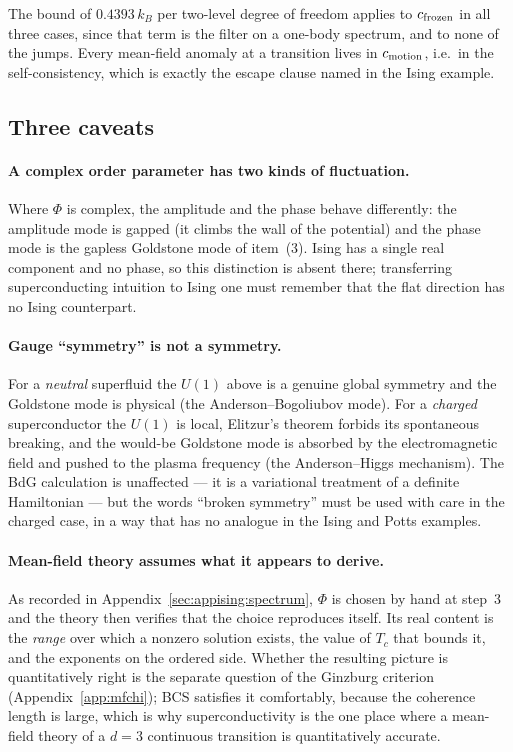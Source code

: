 \documentclass[10pt,a4paper]{article}
\theoremstyle{remark}
\begin{document}
The bound of $0.4393\,k_B$ per two-level degree of freedom applies to $c_{\rm frozen}$ in all three
cases, since that term is the filter on a one-body spectrum, and to none of the
jumps. Every mean-field anomaly at a transition lives in $c_{\rm motion}$, i.e.\
in the self-consistency, which is exactly the escape clause named in the Ising example.

\subsection{Three caveats}
\label{sec:mfgeneric:caveats}

\paragraph{A complex order parameter has two kinds of fluctuation.} Where $\Phi$
is complex, the amplitude and the phase behave differently: the amplitude mode is
gapped (it climbs the wall of the potential) and the phase mode is the gapless
Goldstone mode of item~(3). Ising has a single real component and no phase, so
this distinction is absent there; transferring superconducting intuition to Ising
one must remember that the flat direction has no Ising counterpart.

\paragraph{Gauge ``symmetry'' is not a symmetry.} For a \emph{neutral} superfluid
the $U(1)$ above is a genuine global symmetry and the Goldstone mode is physical
(the Anderson--Bogoliubov mode). For a \emph{charged} superconductor the $U(1)$
is local, Elitzur's theorem forbids its spontaneous breaking, and the would-be
Goldstone mode is absorbed by the electromagnetic field and pushed to the plasma
frequency (the Anderson--Higgs mechanism). The BdG calculation is unaffected ---
it is a variational treatment of a definite Hamiltonian --- but the words
``broken symmetry'' must be used with care in the charged case, in a way that has
no analogue in the Ising and Potts examples.

\paragraph{Mean-field theory assumes what it appears to derive.} As recorded in
Appendix~\ref{sec:appising:spectrum}, $\Phi$ is chosen by hand at step~3 and the
theory then verifies that the choice reproduces itself. Its real content is the
\emph{range} over which a nonzero solution exists, the value of $T_c$ that bounds
it, and the exponents on the ordered side. Whether the resulting picture is
quantitatively right is the separate question of the Ginzburg criterion
(Appendix~\ref{app:mfchi}); BCS satisfies it comfortably, because the
coherence length is large, which is why superconductivity is the one place where
a mean-field theory of a $d=3$ continuous transition is quantitatively accurate.
\end{document}
